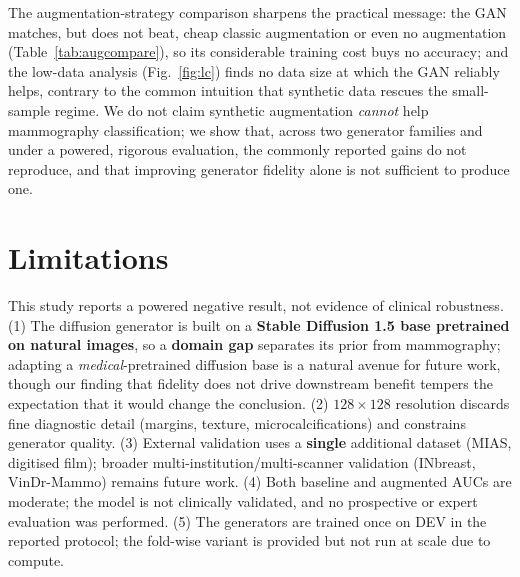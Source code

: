 \documentclass[runningheads]{llncs}
\begin{document}
The augmentation-strategy comparison sharpens the practical message: the GAN
matches, but does not beat, cheap classic augmentation or even no augmentation
(Table~\ref{tab:augcompare}), so its considerable training cost buys no accuracy;
and the low-data analysis (Fig.~\ref{fig:lc}) finds no data size at which the GAN
reliably helps, contrary to the common intuition that synthetic data rescues the
small-sample regime. We do not claim synthetic augmentation \emph{cannot} help
mammography classification; we show that, across two generator families and under
a powered, rigorous evaluation, the commonly reported gains do not reproduce, and
that improving generator fidelity alone is not sufficient to produce one.

\section{Limitations}
This study reports a powered negative result, not evidence of clinical
robustness. (1) The diffusion generator is built on a \textbf{Stable Diffusion
1.5 base pretrained on natural images}, so a \textbf{domain gap} separates its
prior from mammography; adapting a \emph{medical}-pretrained diffusion base is a
natural avenue for future work, though our finding that fidelity does not drive
downstream benefit tempers the expectation that it would change the conclusion.
(2) $128\times128$ resolution discards fine diagnostic detail (margins, texture,
microcalcifications) and constrains generator quality. (3) External validation
uses a \textbf{single} additional dataset (MIAS, digitised film); broader
multi-institution/multi-scanner validation (INbreast, VinDr-Mammo) remains future
work. (4) Both baseline and augmented AUCs are moderate; the model is not
clinically validated, and no prospective or expert evaluation was performed.
(5) The generators are trained once on DEV in the reported protocol; the
fold-wise variant is provided but not run at scale due to compute.

\end{document}
